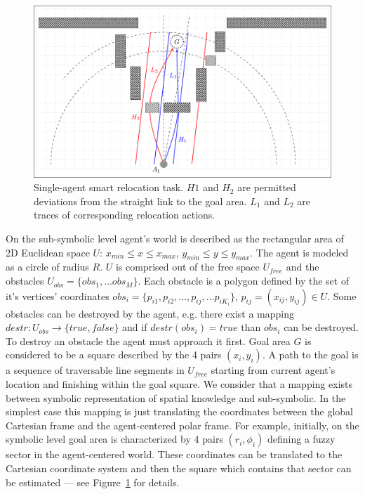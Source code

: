\documentclass[procedia]{easychair}
\begin{document}
\begin{figure}[tb]
	\begin{centering}
		\includegraphics[width=\textwidth]{bica_psy_path}
		\caption{Single-agent smart relocation task. $H1$ and $H_2$ are permitted deviations from the straight link to the goal area. $L_1$ and $L_2$ are traces of corresponding relocation actions.}
		\label{fig:example}
	\end{centering}
\end{figure}

On the sub-symbolic level agent's world is described as the rectangular area of 2D Euclidean space $U$: $x_{min} \leq x \leq x_{max}$, $y_{min} \leq y \leq y_{max}$. The agent is modeled as a circle of radius $R$. $U$ is comprised out of the free space $U_{free}$ and the obstacles $U_{obs}=\{obs_1,\dots obs_M\}$. Each obstacle is a polygon defined by the set of it's vertices' coordinates $obs_i=\{p_{i1}, p_{i2}, \dots, p_{ij}, \dots p_{iK_i}\}$, $p_{ij}=(x_{ij}, y_{ij})\in U$. Some obstacles can be destroyed by the agent, e.g. there exist a mapping $destr: U_{obs} \rightarrow \{true, false\}$ and if $destr(obs_i)=true$ than $obs_i$ can be destroyed. To destroy an obstacle the agent must approach it first. Goal area $G$ is considered to be a square described by the 4 pairs $(x_i, y_i)$. A path to the goal is a sequence of traversable line segments in $U_{free}$ starting from current agent's location and finishing within the goal square. We consider that a mapping exists between symbolic representation of spatial knowledge and sub-symbolic. In the simplest case this mapping is just translating the coordinates between the global Cartesian frame and the agent-centered polar frame. For example, initially, on the symbolic level goal area is characterized by 4 pairs $(r_i, \phi_i)$ defining a fuzzy sector in the agent-centered world. These coordinates can be translated to the Cartesian coordinate system and then the square which contains that sector can be estimated --- see Figure~\ref{fig:example} for details.
\end{document}
